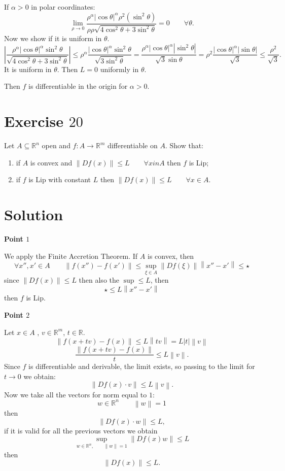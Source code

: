 \documentclass[a4paper, twoside, openany]{book}
\newcommand{\norm}[1]{\left\lVert#1\right\rVert}
\begin{document}
If $\alpha > 0$ in polar coordinates:
$$\lim_{\rho \rightarrow 0} \frac{\rho^{\alpha} |\cos \theta|^{\alpha} \rho^2 (\sin^2 \theta)}{\rho \rho \sqrt{4 \cos^2 \theta + 3 \sin^2 \theta}} = 0 \qquad \forall \theta.$$
Now we show if it is uniform in $\theta$.
$$|\frac{\rho^{\alpha} |\cos \theta|^{\alpha} \sin^2 \theta}{\sqrt{4 \cos^2 \theta + 3 \sin^2 \theta}}| \leq \rho^{\alpha} \frac{|\cos \theta|^{\alpha} \sin^2 \theta}{\sqrt{3 \sin^2 \theta}} = \frac{\rho^{\alpha} |\cos \theta|^{\alpha} |\sin^2 \theta|}{\sqrt{3} \sin \theta} = \rho^2 \frac{|\cos \theta|^{\alpha} |\sin \theta|}{\sqrt{3}} \leq \frac{\rho^2}{\sqrt{3}}.$$
It is uniform in $\theta$. Then $L = 0$ uniformly in $\theta$. \par  
Then $f$ is differentiable in the origin for $\alpha > 0$.
\clearpage
\section*{Exercise $20$}
Let $A \subseteq \mathbb{R}^n$ open and $f: A \rightarrow \mathbb{R}^m$ differentiable on $A$. Show that:
\begin{enumerate}
\item if $A$ is convex and $\norm{Df(x)} \leq L \qquad \forall x 	in A$ then $f$ is Lip;
\item if $f$ is Lip with constant $L$ then $\norm{Df(x)} \leq L \qquad \forall x \in A$.
\end{enumerate}
\section*{Solution}
\textbf{Point $1$} \par 
We apply the Finite Accretion Theorem. If $A$ is convex, then
$$\forall x'', x' \in A \qquad \norm{f(x'') - f(x')} \leq \sup_{\xi \in A} \norm{Df(\xi)} \norm{x'' - x'} \leq \star$$
since $\norm{Df(x)} \leq L$ then also the $\sup \leq L$, then
$$\star \leq L \norm{x'' - x'}$$
then $f$ is Lip. \par   
\textbf{Point $2$} \par   
Let $x \in A$ , $v \in \mathbb{R}^m$, $t \in \mathbb{R}$.
$$\norm{f(x + tv) - f(x)} \leq L \norm{t v} = L |t| \norm{v}$$
$$\frac{\norm{f(x + tv) - f(x)}}{t} \leq L \norm{v}.$$
Since $f$ is differentiable and derivable, the limit exists, so passing to the limit for $t \rightarrow 0$ we obtain:
$$\norm{Df(x) \cdot v} \leq L \norm{v}.$$
Now we take all the vectors for norm equal to $1$:
$$w \in \mathbb{R}^n \qquad \norm{w} = 1$$
then
$$\norm{Df(x) \cdot w } \leq L,$$
if it is valid for all the previous vectors we obtain
$$\sup_{w \in \mathbb{R}^n, \qquad \norm{w} = 1} \norm{Df(x) w} \leq L$$
then
$$\norm{Df(x)} \leq L.$$
\clearpage
\end{document}
